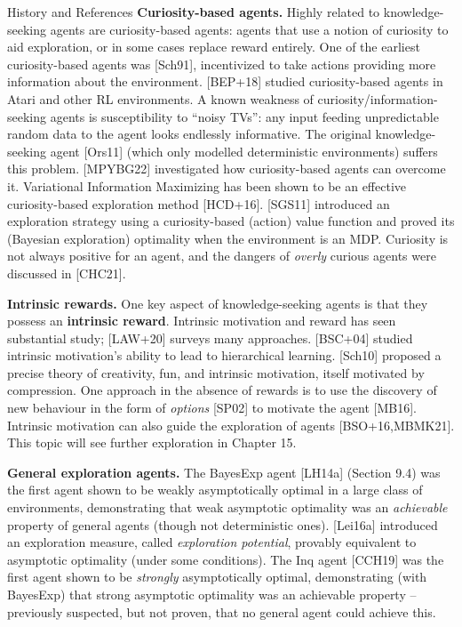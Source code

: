 \documentclass[aspectratio=169,10pt]{beamer}
\begin{document}
\begin{frame}[allowframebreaks]{History and References}
  \vspace{0.3em}
  \textbf{Curiosity-based agents.} Highly related to knowledge-seeking
  agents are curiosity-based agents: agents that use a notion of curiosity
  to aid exploration, or in some cases replace reward entirely. One of the
  earliest curiosity-based agents was [Sch91], incentivized to take
  actions providing more information about the environment. [BEP+18]
  studied curiosity-based agents in Atari and other RL environments. A
  known weakness of curiosity/information-seeking agents is susceptibility
  to ``noisy TVs'': any input feeding unpredictable random data to the
  agent looks endlessly informative. The original knowledge-seeking agent
  [Ors11] (which only modelled deterministic environments) suffers this
  problem. [MPYBG22] investigated how curiosity-based agents can overcome
  it. Variational Information Maximizing has been shown to be an effective
  curiosity-based exploration method [HCD+16]. [SGS11] introduced an
  exploration strategy using a curiosity-based (action) value function and
  proved its (Bayesian exploration) optimality when the environment is an
  MDP. Curiosity is not always positive for an agent, and the dangers of
  \emph{overly} curious agents were discussed in [CHC21].

  \framebreak
  \textbf{Intrinsic rewards.} One key aspect of knowledge-seeking agents is
  that they possess an \textbf{intrinsic reward}. Intrinsic motivation and
  reward has seen substantial study; [LAW+20] surveys many approaches.
  [BSC+04] studied intrinsic motivation's ability to lead to hierarchical
  learning. [Sch10] proposed a precise theory of creativity, fun, and
  intrinsic motivation, itself motivated by compression. One approach in
  the absence of rewards is to use the discovery of new behaviour in the
  form of \emph{options} [SP02] to motivate the agent [MB16]. Intrinsic
  motivation can also guide the exploration of agents [BSO+16,MBMK21]. This
  topic will see further exploration in Chapter 15.

  \framebreak
  \textbf{General exploration agents.} The BayesExp agent [LH14a] (Section
  9.4) was the first agent shown to be weakly asymptotically optimal in a
  large class of environments, demonstrating that weak asymptotic
  optimality was an \emph{achievable} property of general agents (though
  not deterministic ones). [Lei16a] introduced an exploration measure,
  called \emph{exploration potential}, provably equivalent to asymptotic
  optimality (under some conditions). The Inq agent [CCH19] was the first
  agent shown to be \emph{strongly} asymptotically optimal, demonstrating
  (with BayesExp) that strong asymptotic optimality was an achievable
  property -- previously suspected, but not proven, that no general agent
  could achieve this.


\end{frame}
\end{document}

